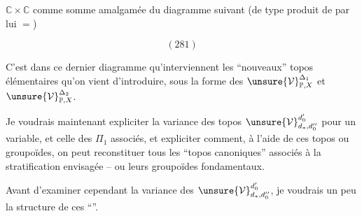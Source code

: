 $\mathbb C\times\mathbb C$ comme somme amalgamée du diagramme suivant (de type produit de
\diagram{\begin{tikzcd}[ampersand replacement=\&,column sep=small]
{}\&\bullet\arrow[l]\arrow[r]\&{}
\end{tikzcd}}
par lui $=$)

\[
(281)
\]

C'est dans ce dernier diagramme qu'interviennent les ``nouveaux'' topos élémentaires qu'on vient d'introduire, sous la forme des $\unsure{\mathcal V}^{\Delta_1}_{\mathbb P,X}$ et $\unsure{\mathcal V}^{\Delta_2}_{\mathbb P,X}$.

Je voudrais maintenant expliciter la variance des topos $\unsure{\mathcal V}^{d'_0}_{d_*,d''_0}$ pour un  variable, et celle des $\Pi_1$ associés, et expliciter comment, à l'aide de ces topos ou groupoïdes, on peut reconstituer tous les ``topos canoniques'' associés à la stratification envisagée -- ou leurs groupoïdes fondamentaux.

Avant  d'examiner cependant la variance des $\unsure{\mathcal V}^{d'_0}_{d_*,d''_0}$, je voudrais  un peu la structure de ces ``''.

